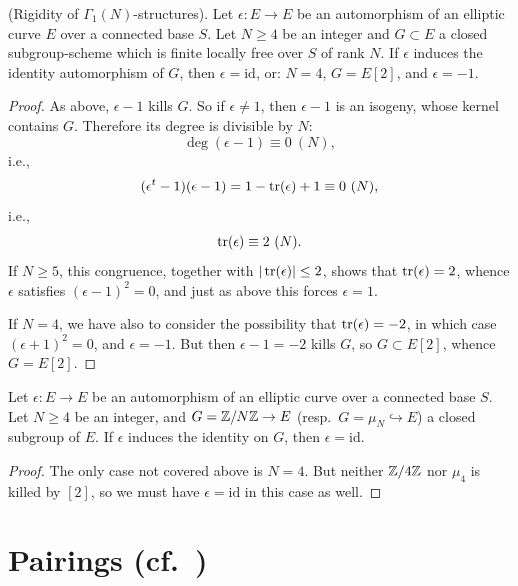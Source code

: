 \begin{corollary}\label{cor:2.7.3}
(Rigidity of $\Gamma_1(N)$-structures). Let $\epsilon : E \to E$ be an automorphism of an elliptic curve $E$ over a connected base $S$. Let $N \ge 4$ be an integer and $G \subset E$ a closed subgroup-scheme which is finite locally free over $S$ of rank $N$. If $\epsilon$ induces the identity automorphism of $G$, then $\epsilon = \mathrm{id}$, or: $N = 4$, $G = E[2]$, and $\epsilon = -1$.
\end{corollary}

\begin{proof}
As above, $\epsilon - 1$ kills $G$. So if $\epsilon \ne 1$, then $\epsilon - 1$ is an isogeny, whose kernel contains $G$. Therefore its degree is divisible by $N$:
\[
\deg(\epsilon - 1) \equiv 0 \ (N),
\]
i.e.,
\[
(\epsilon^t - 1)(\epsilon - 1) = 1 - \operatorname{tr}(\epsilon) + 1 \equiv 0 \ (N),
\]
i.e.,
\[
\operatorname{tr}(\epsilon) \equiv 2 \ (N).
\]
If $N \ge 5$, this congruence, together with $|\operatorname{tr}(\epsilon)| \le 2$, shows that $\operatorname{tr}(\epsilon) = 2$, whence $\epsilon$ satisfies $(\epsilon - 1)^2 = 0$, and just as above this forces $\epsilon = 1$.

If $N = 4$, we have also to consider the possibility that $\operatorname{tr}(\epsilon) = -2$, in which case $(\epsilon + 1)^2 = 0$, and $\epsilon = -1$. But then $\epsilon - 1 = -2$ kills $G$, so $G \subset E[2]$, whence $G = E[2]$.
\end{proof}

\begin{corollary}\label{cor:2.7.4}
Let $\epsilon : E \to E$ be an automorphism of an elliptic curve over a connected base $S$. Let $N \ge 4$ be an integer, and $G = \mathbb{Z}/N\mathbb{Z} \to E$ (resp.\ $G = \mu_N \hookrightarrow E$) a closed subgroup of $E$. If $\epsilon$ induces the identity on $G$, then $\epsilon = \mathrm{id}$.
\end{corollary}

\begin{proof}
The only case not covered above is $N = 4$. But neither $\mathbb{Z}/4\mathbb{Z}$ nor $\mu_4$ is killed by $[2]$, so we must have $\epsilon = \mathrm{id}$ in this case as well.
\end{proof}

\section{Pairings (cf.~\cite{Oda})}
\label{sec:2.8}

